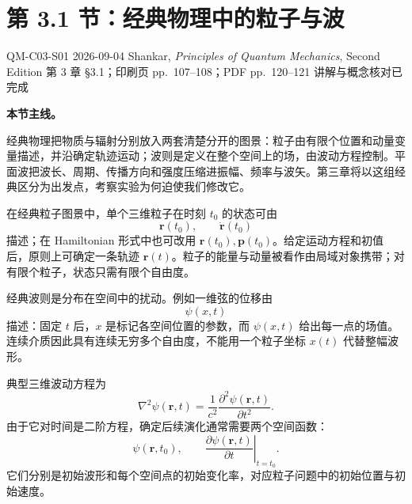 
\section{第 3.1 节：经典物理中的粒子与波}
\label{section:QM-C03-S01}

\studymeta
  {QM-C03-S01}
  {2026-09-04}
  {Shankar, \textit{Principles of Quantum Mechanics}, Second Edition}
  {第 3 章 \S 3.1；印刷页 pp.~107--108；PDF pp.~120--121}
  {讲解与概念核对已完成}

\textbf{本节主线。}

经典物理把物质与辐射分别放入两套清楚分开的图景：粒子由有限个位置和动量变量描述，并沿确定轨迹运动；波则是定义在整个空间上的场，由波动方程控制。平面波把波长、周期、传播方向和强度压缩进振幅、频率与波矢。第三章将以这组经典区分为出发点，考察实验为何迫使我们修改它。



在经典粒子图景中，单个三维粒子在时刻 $t_0$ 的状态可由
\begin{equation}
  \bm r(t_0),\qquad \dot{\bm r}(t_0)
  \label{eq:QM-C03-S01-particle-initial-data}
\end{equation}
描述；在 Hamiltonian 形式中也可改用 $\bm r(t_0),\bm p(t_0)$。给定运动方程和初值后，原则上可确定一条轨迹 $\bm r(t)$。粒子的能量与动量被看作由局域对象携带；对有限个粒子，状态只需有限个自由度。

经典波则是分布在空间中的扰动。例如一维弦的位移由
\[
  \psi(x,t)
\]
描述：固定 $t$ 后，$x$ 是标记各空间位置的参数，而 $\psi(x,t)$ 给出每一点的场值。连续介质因此具有连续无穷多个自由度，不能用一个粒子坐标 $x(t)$ 代替整幅波形。

典型三维波动方程为
\begin{equation}
  \boxed{
  \nabla^2\psi(\bm r,t)
  =\frac{1}{c^2}
  \frac{\partial^2\psi(\bm r,t)}{\partial t^2}.}
  \label{eq:QM-C03-S01-wave-equation}
\end{equation}
由于它对时间是二阶方程，确定后续演化通常需要两个空间函数：
\begin{equation}
  \psi(\bm r,t_0),
  \qquad
  \left.\frac{\partial\psi(\bm r,t)}{\partial t}\right|_{t=t_0}.
  \label{eq:QM-C03-S01-wave-initial-data}
\end{equation}
它们分别是初始波形和每个空间点的初始变化率，对应粒子问题中的初始位置与初始速度。


